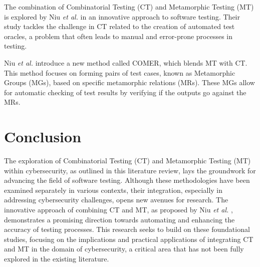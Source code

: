 The combination of Combinatorial Testing (CT) and Metamorphic Testing (MT) is explored by Niu \textit{et al.} \cite{comer} in an innovative approach to software testing. Their study tackles the challenge in CT related to the creation of automated test oracles, a problem that often leads to manual and error-prone processes in testing.

Niu \textit{et al.} introduce a new method called COMER, which blends MT with CT. This method focuses on forming pairs of test cases, known as Metamorphic Groups (MGs), based on specific metamorphic relations (MRs). These MGs allow for automatic checking of test results by verifying if the outputs go against the MRs.


\section{Conclusion}\label{sec:conclusion}

The exploration of Combinatorial Testing (CT) and Metamorphic Testing (MT) within cybersecurity, as outlined in this literature review, lays the groundwork for advancing the field of software testing. Although these methodologies have been examined separately in various contexts, their integration, especially in addressing cybersecurity challenges, opens new avenues for research. The innovative approach of combining CT and MT, as proposed by Niu \textit{et al.} \cite{comer}, demonstrates a promising direction towards automating and enhancing the accuracy of testing processes. This research seeks to build on these foundational studies, focusing on the implications and practical applications of integrating CT and MT in the domain of cybersecurity, a critical area that has not been fully explored in the existing literature.

\newpage
